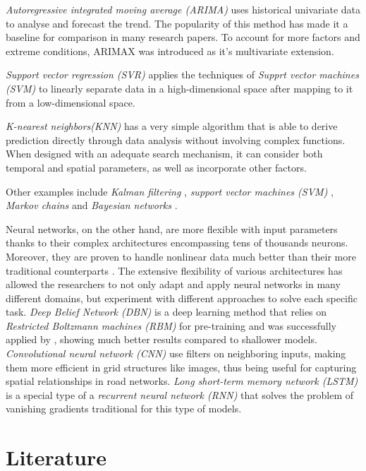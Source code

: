 \textit{Autoregressive integrated moving average (ARIMA)} \cite{Min.2011} uses
historical univariate data to analyse and forecast the trend. The popularity of
this method has made it a baseline for comparison in many research papers. To
account for more factors and extreme conditions, ARIMAX \cite{Tsirigotis.2012}
was introduced as it's multivariate extension.

\textit{Support vector regression (SVR)} \cite{Muller.1997} applies the
techniques of \textit{Supprt vector machines (SVM)} \cite{Mukherjee.1997} to
linearly separate data in a high-dimensional space after mapping to it from a 
low-dimensional space.

\textit{K-nearest neighbors(KNN)} \cite{Zhang.2013} has a very simple algorithm
that is able to derive prediction directly through data analysis without
involving complex functions. When designed with an adequate search mechanism, it
can consider both temporal and spatial parameters, as well as incorporate other 
factors.

Other examples include \textit{Kalman filtering} \cite{Guo.2014},
\textit{support vector machines (SVM)} \cite{Yang.2006}, \textit{Markov chains}
\cite{Qi.2014} and \textit{Bayesian networks} \cite{Wang.2014}.

Neural networks, on the other hand, are more flexible with input parameters
thanks to their complex architectures encompassing tens of thousands neurons.
Moreover, they are proven to handle nonlinear data much better than their more
traditional counterparts \cite{Chan.2012}. The extensive flexibility of various
architectures has allowed the researchers to not only adapt and apply neural
networks in many different domains, but experiment with different approaches to
solve each specific task. \textit{Deep Belief Network (DBN)} is a deep learning
method that relies on \textit{Restricted Boltzmann machines (RBM)}
\cite{Hinton.2006} for pre-training and was successfully applied by
\citet{Huang.2014}, showing much better results compared to shallower models.
\textit{Convolutional neural network (CNN)} \cite{Krizhevsky.2012} use filters
on neighboring inputs, making them more efficient in grid structures like
images, thus being useful for capturing spatial relationships in road networks.
\textit{Long short-term memory network (LSTM)} \cite{Graves.2013} is a special
type of a \textit{recurrent neural network (RNN)} that solves the problem of
vanishing gradients traditional for this type of models.


\chapter{Literature}

